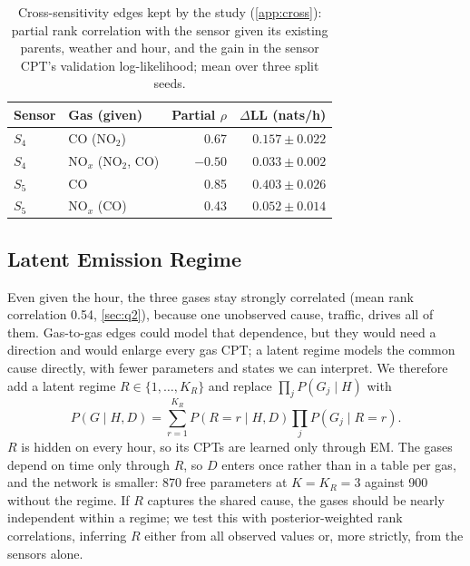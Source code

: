 \begin{table}[t]
  \centering\small
  \caption{Cross-sensitivity edges kept by the study (\cref{app:cross}):
  partial rank correlation with the sensor given its existing parents, weather
  and hour, and the gain in the sensor CPT's validation log-likelihood; mean
  over three split seeds.}
  \label{tab:cross-main}
  \begin{tabular}{llrr}
    \toprule
    Sensor & Gas (given) & Partial $\rho$ & $\Delta$LL (nats/h) \\
    \midrule
    $S_4$ & CO (NO$_2$)         & 0.67    & $0.157 \pm 0.022$ \\
    $S_4$ & NO$_x$ (NO$_2$, CO) & $-0.50$ & $0.033 \pm 0.002$ \\
    $S_5$ & CO                  & 0.85    & $0.403 \pm 0.026$ \\
    $S_5$ & NO$_x$ (CO)         & 0.43    & $0.052 \pm 0.014$ \\
    \bottomrule
  \end{tabular}
\end{table}

\subsection{Latent Emission Regime}
\label{sec:latent}
Even given the hour, the three gases stay strongly correlated (mean rank
correlation 0.54, \cref{sec:q2}), because one unobserved cause, traffic,
drives all of them. Gas-to-gas edges could model that dependence, but they
would need a direction and would enlarge every gas CPT; a latent regime models
the common cause directly, with fewer parameters and states we can interpret.
We therefore add a latent regime $R \in \{1,\dots,K_R\}$ and replace
$\prod_j P(G_j \mid H)$ with
\begin{equation}
  P(G \mid H, D) = \sum_{r=1}^{K_R} P(R{=}r \mid H, D)
  \prod_{j} P(G_j \mid R{=}r).
  \label{eq:latent}
\end{equation}
$R$ is hidden on every hour, so its CPTs are learned only through EM. The
gases depend on time only through $R$, so $D$ enters once rather than in a
table per gas, and the network is smaller: 870 free parameters at
$K = K_R = 3$ against 900 without the regime. If $R$ captures the shared
cause, the gases should be nearly independent within a regime; we test this
with posterior-weighted rank correlations, inferring $R$ either from all
observed values or, more strictly, from the sensors alone.

